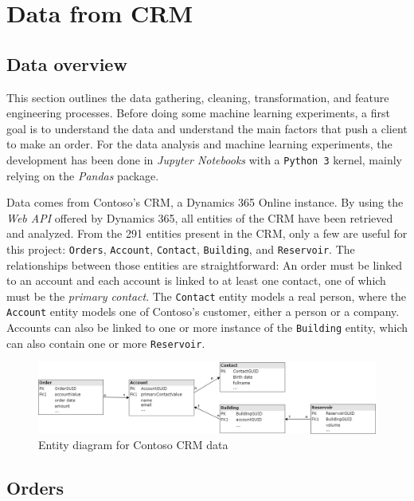 \section{Data from CRM} \label{sec:crm-data}

\subsection{Data overview}
This section outlines the data gathering, cleaning, transformation, and feature engineering processes. Before doing some machine learning experiments, a first goal is to understand the data and understand the main factors that push a client to make an order. For the data analysis and machine learning experiments, the development has been done in \textit{Jupyter Notebooks} with a \texttt{Python 3} kernel, mainly relying on the \textit{Pandas} package.

Data comes from Contoso's CRM, a Dynamics 365 Online instance. By using the \textit{Web API} offered by Dynamics 365, all entities of the CRM have been retrieved and analyzed. From the 291 entities present in the CRM, only a few are useful for this project: \texttt{Orders}, \texttt{Account}, \texttt{Contact}, \texttt{Building}, and \texttt{Reservoir}. The relationships between those entities are straightforward: An order must be linked to an account and each account is linked to at least one contact, one of which must be the \textit{primary contact}. The \texttt{Contact} entity models a real person, where the \texttt{Account} entity models one of Contoso's customer, either a person or a company. Accounts can also be linked to one or more instance of the \texttt{Building} entity, which can also contain one or more \texttt{Reservoir}.

\begin{figure}[h]
    \centering
    \includegraphics[width=15cm]{images/entityDiagram.png}
    \caption[Entity diagram of the CRM data]{Entity diagram for Contoso CRM data}
    \label{fig:entity-diagram}
\end{figure}

\subsection{Orders}\label{sec:crm-orders}

